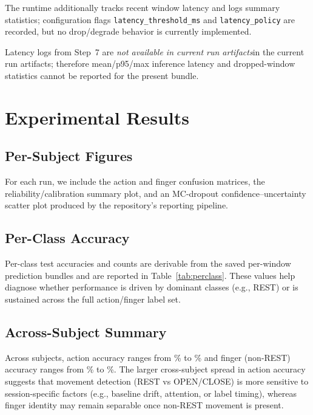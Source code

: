 \documentclass[conference]{IEEEtran}
\newcommand{\NotAvailable}{\textit{not available in current run artifacts}}
\begin{document}
The runtime additionally tracks recent window latency and logs summary statistics; configuration flags \texttt{latency\_threshold\_ms} and \texttt{latency\_policy} are recorded, but no drop/degrade behavior is currently implemented.

Latency logs from Step~7 are \NotAvailable in the current run artifacts; therefore mean/p95/max inference latency and dropped-window statistics cannot be reported for the present bundle.

\section{Experimental Results}




\subsection{Per-Subject Figures}
For each run, we include the action and finger confusion matrices, the reliability/calibration summary plot, and an MC-dropout confidence--uncertainty scatter plot produced by the repository’s reporting pipeline.



\subsection{Per-Class Accuracy}
Per-class test accuracies and counts are derivable from the saved per-window prediction bundles and are reported in Table~\ref{tab:perclass}. These values help diagnose whether performance is driven by dominant classes (e.g., REST) or is sustained across the full action/finger label set.



\subsection{Across-Subject Summary}
Across \NumSubjects subjects, action accuracy ranges from \ActionAccMin\% to \ActionAccMax\% and finger (non-REST) accuracy ranges from \FingerAccMin\% to \FingerAccMax\%. The larger cross-subject spread in action accuracy suggests that movement detection (REST vs OPEN/CLOSE) is more sensitive to session-specific factors (e.g., baseline drift, attention, or label timing), whereas finger identity may remain separable once non-REST movement is present.
\end{document}
